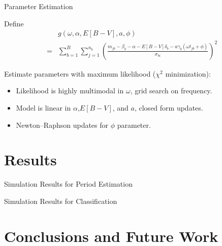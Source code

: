 \documentclass[12pt]{beamer}
\begin{document}
\begin{frame}{Parameter Estimation}

Define
\begin{align*}
&g(\omega,\alpha,E[B-V],a,\phi) \\
= &\sum_{b=1}^B \sum_{j=1}^{n_b}\left(\frac{m_{jb} - \beta_b - \alpha - E[B-V]\delta_b - a\gamma_b(\omega t_{jb} + \phi)}{\sigma_{bi}}\right)^2
\end{align*}

Estimate parameters with maximum likelihood ($\chi^2$ minimization):
\begin{itemize}
\item Likelihood is highly multimodal in $\omega$, grid search on frequency.
\item Model is linear in $\alpha$,$E[B-V]$, and $a$, closed form updates.
\item Newton--Raphson updates for $\phi$ parameter.
\end{itemize}

\end{frame}


\section{Results}

\begin{frame}{Simulation Results for Period Estimation}


\end{frame}


\begin{frame}{Simulation Results for Classification}


\end{frame}


\section{Conclusions and Future Work}


\end{document}
